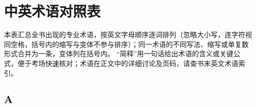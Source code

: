 \chapter{中英术语对照表}

本表汇总全书出现的专业术语，按英文字母顺序逐词排列（忽略大小写，连字符视同空格，括号内的缩写与变体不参与排序）；同一术语的不同写法、缩写或单复数形式合并为一条，变体列在括号内。
“简释”用一句话给出术语的含义或关键公式，便于考场快速核对；术语在正文中的详细讨论及页码，请查书末英文术语索引。

\begingroup
\footnotesize
\setlength{\LTpre}{2pt}\setlength{\LTpost}{4pt}
\renewcommand{\arraystretch}{1.1}

\par{}\ifdim\dimexpr\pagegoal-\pagetotal\relax<16\baselineskip\newpage\fi
\section*{A}
